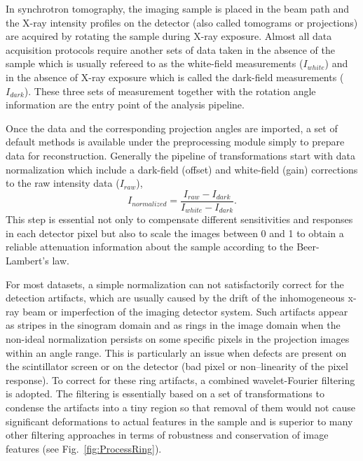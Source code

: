 \documentclass[pdf]{iucr}              %
\begin{document}
In synchrotron tomography, the imaging sample is placed in the beam path and the X-ray intensity profiles on the detector (also called tomograms or projections) are acquired by rotating the sample during X-ray exposure. Almost all data acquisition protocols require another sets of data taken in the absence of the sample which is usually refereed to as the white-field measurements ($I_{white}$) and in the absence of X-ray exposure which is called the dark-field measurements ($I_{dark}$). These three sets of measurement together with the rotation angle information are the entry point of the analysis pipeline.

Once the data and the corresponding projection angles are imported, a set of default methods is available under the preprocessing module simply to prepare data for reconstruction. Generally the pipeline of transformations start with data normalization which include a dark-field (offset) and white-field (gain) corrections to the raw intensity data ($I_{raw}$),
\begin{equation}
I_{normalized}=\frac{I_{{raw}}-I_{{dark}}}{I_{{white}}-I_{{dark}}}.
\end{equation}
This step is essential not only to compensate different sensitivities and responses in each detector pixel but also to scale the images between 0 and 1 to obtain a reliable attenuation information about the sample according to the Beer-Lambert's law. 

For most datasets, a simple normalization can not satisfactorily correct for the detection artifacts, which are usually caused by the drift of the inhomogeneous x-ray beam or imperfection of the imaging detector system. Such artifacts appear as stripes in the sinogram domain and as rings in the image domain when the non-ideal normalization persists on some specific pixels in the projection images within an angle range. This is particularly an issue when defects are present on the scintillator screen or on the detector (bad pixel or non--linearity of the pixel response). To correct for these ring artifacts, a combined wavelet-Fourier filtering  \cite{Munch:09} is adopted. The filtering is essentially based on a set of transformations to condense the artifacts into a tiny region so that removal of them would not cause significant deformations to actual features in the sample and is superior to many other filtering approaches in terms of robustness and conservation of image features (see Fig.~\ref{fig:ProcessRing}).
\end{document}
